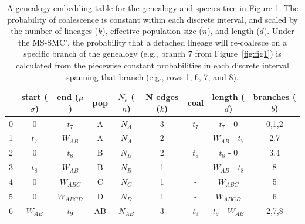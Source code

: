 \documentclass[11pt]{article}
\begin{document}


\begin{table}[t]
\centering
\caption{
	A genealogy embedding table for the genealogy and species tree in Figure 1. 
	The probability of coalescence is constant within each discrete interval, 
	and scaled by the number of lineages ($k$), effective population size ($n$), 
	and length ($d$).
	Under the MS-SMC', the probability that a detached lineage will re-coalesce
	on a specific branch of the genealogy (e.g., branch 7 from Figure~\ref{fig:fig1})
	is calculated from the piecewise constant probabilities in each 
	discrete interval spanning that branch (e.g., rows 1, 6, 7, and 8).
}
\begin{tabular}[t]{ |c|c|c|c|c|c|c|c|c| }
	\toprule
	 & start ($\sigma$)  & end ($\mu$)  & pop & $N_e$ ($n$)  & N edges ($k$) & coal  & length ($d$) & branches ($b$) \\
	\midrule
	0 & 0          & $t_7$      & A   & $N_A$     & 3 & $t_7$    & $t_7$ - 0            & 0,1,2 \\
	1 & $t_7$      & $W_{AB}$   & A   & $N_A$     & 2 & -        & $W_{AB}$ - $t_7$     & 2,7   \\	
	2 & 0          & $t_8$      & B   & $N_B$     & 2 & $t_8$    & $t_8$ - 0            & 3,4   \\ 
	3 & $t_8$      & $W_{AB}$   & B   & $N_B$     & 1 & -        & $W_{AB}$ - $t_8$     & 8     \\
	4 & 0          & $W_{ABC}$  & C   & $N_C$     & 1 & -        & $W_{ABC}$            & 5     \\
	5 & 0          & $W_{ABCD}$ & D   & $N_D$     & 1 & -        & $W_{ABCD}$           & 6     \\
	6 & $W_{AB}$   & $t_9$      & AB  & $N_{AB}$  & 3 & $t_9$    & $t_9$ - $W_{AB}$     & 2,7,8 \\

\end{tabular}
\end{table}
\end{document}

